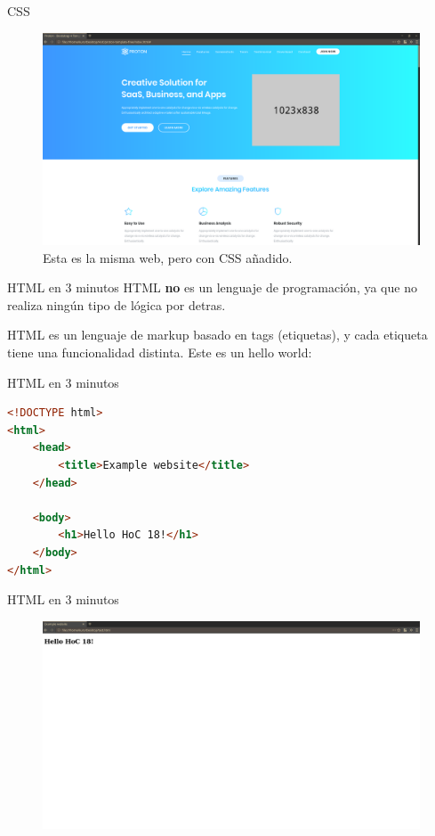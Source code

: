 \documentclass{beamer}
\begin{document}
\begin{frame}{CSS}
\begin{figure}
    \centering
    \includegraphics[width=\textwidth]{images/css.png}
    \caption{Esta es la misma web, pero con CSS añadido.}
\end{figure}
\end{frame}

\begin{frame}{HTML en 3 minutos}
HTML \textbf{no} es un lenguaje de programación, ya que no realiza ningún tipo de lógica por detras.

HTML es un lenguaje de markup basado en tags (etiquetas), y cada etiqueta tiene una funcionalidad distinta. Este es un hello world:
    
\end{frame}

\begin{frame}[fragile]{HTML en 3 minutos}
\begin{lstlisting}[language=HTML]
<!DOCTYPE html>
<html>
    <head>
        <title>Example website</title>
    </head>

    <body>
        <h1>Hello HoC 18!</h1>
    </body>
</html> 
\end{lstlisting}
\end{frame}

\begin{frame}{HTML en 3 minutos}
\begin{figure}
    \centering
    \includegraphics[width=\textwidth]{images/helloworldhtml.png}
\end{figure}
\end{frame}
\end{document}
